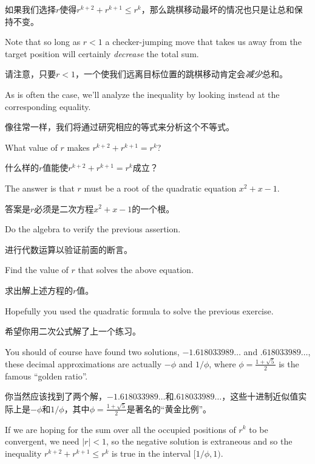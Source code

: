 如果我们选择$r$使得$r^{k+2} + r^{k+1} \leq r^k$，那么跳棋移动最坏的情况也只是让总和保持不变。

Note that
so long as $r<1$ a checker-jumping move that takes us away from the target 
position will certainly {\em decrease} the total sum.

请注意，只要$r<1$，一个使我们远离目标位置的跳棋移动肯定会\emph{减少}总和。

As is often the case, we'll analyze the inequality by looking instead at the
corresponding equality.

像往常一样，我们将通过研究相应的等式来分析这个不等式。

What value of $r$ makes  $r^{k+2} + r^{k+1}  =  r^k$?

什么样的$r$值能使$r^{k+2} + r^{k+1} = r^k$成立？

The answer is that $r$ must be a root of the quadratic equation $x^2+x-1$.

答案是$r$必须是二次方程$x^2+x-1$的一个根。

\begin{exer}
Do the algebra to verify the previous assertion.
\end{exer}

\begin{exer}
进行代数运算以验证前面的断言。
\end{exer}

\begin{exer}
Find the value of $r$ that solves the above equation.
\end{exer}

\begin{exer}
求出解上述方程的$r$值。
\end{exer}

Hopefully you used the quadratic formula to solve the previous 
exercise.

希望你用二次公式解了上一个练习。

You should of course have found two solutions, $-1.618033989\ldots$
and $.618033989\ldots$, these decimal approximations are actually $-\phi$ and $1/\phi$, where $\displaystyle \phi = \frac{1+\sqrt{5}}{2}$ is the famous  ``golden ratio''.

你当然应该找到了两个解，$-1.618033989\ldots$和$.618033989\ldots$，这些十进制近似值实际上是$-\phi$和$1/\phi$，其中$\displaystyle \phi = \frac{1+\sqrt{5}}{2}$是著名的“黄金比例”。

If we are hoping for the sum over all the occupied positions of $r^k$ to be convergent, we need $|r|<1$, so the negative 
solution is extraneous and so the inequality  $r^{k+2} + r^{k+1} \leq r^k$
is true in the interval $[1/\phi, 1)$.

